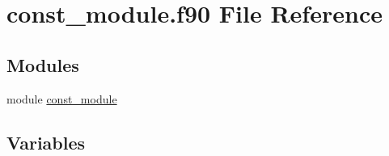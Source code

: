 \hypertarget{const__module_8f90}{}\section{const\+\_\+module.\+f90 File Reference}
\label{const__module_8f90}
\subsection*{Modules}
\begin{DoxyCompactItemize}
\item 
module \hyperlink{namespaceconst__module}{const\+\_\+module}
\end{DoxyCompactItemize}
\subsection*{Variables}
